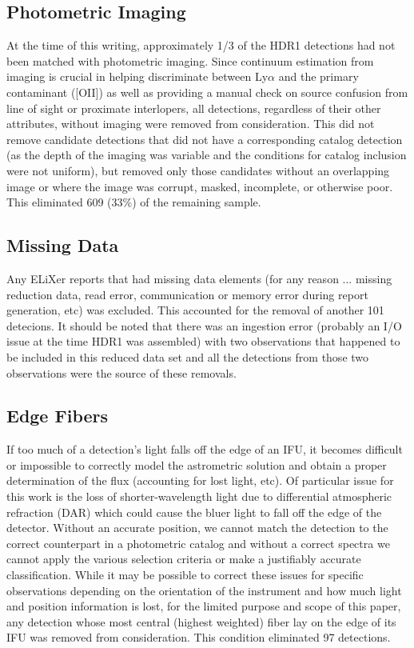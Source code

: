\documentclass{aastex62}
\begin{document}
\subsection{Photometric Imaging}
At the time of this writing, approximately 1/3 of the HDR1 detections had not been matched with photometric imaging. Since continuum estimation from imaging is crucial in helping discriminate between Ly$\alpha$ and the primary contaminant ([OII]) as well as providing a manual check on source confusion from line of sight or proximate interlopers, all detections, regardless of their other attributes, without imaging were removed from consideration. This did not remove candidate detections that did not have a corresponding catalog detection (as the depth of the imaging was variable and the conditions for catalog inclusion were not uniform), but removed only those candidates without an overlapping image or where the image was corrupt, masked, incomplete, or otherwise poor. This eliminated 609 (33\%) of the remaining sample.\\

 \subsection{Missing Data}
 Any ELiXer reports that had missing data elements (for any reason ... missing reduction data, read error, communication or memory error during report generation, etc) was excluded. This accounted for the removal of another 101 detecions. It should be noted that there was an ingestion error (probably an I/O issue at the time HDR1 was assembled) with two observations that happened to be included in this reduced data set and all the detections from those two observations were the source of these removals.\\
 
\subsection{Edge Fibers}
If too much of a detection's light falls off the edge of an IFU, it becomes difficult or impossible to correctly model the astrometric solution and obtain a proper determination of the flux (accounting for lost light, etc). Of particular issue for this work is the loss of shorter-wavelength light due to differential atmospheric refraction (DAR) which could cause the bluer light to fall off the edge of the detector. Without an accurate position, we cannot match the detection to the correct counterpart in a photometric catalog and without a correct spectra we cannot apply the various selection criteria or make a justifiably accurate classification. While it may be possible to correct these issues for specific observations depending on the orientation of the instrument and how much light and position information is lost, for the limited purpose and scope of this paper, any detection whose most central (highest weighted) fiber lay on the edge of its IFU was removed from consideration. This condition eliminated 97 detections. \\
\end{document}
